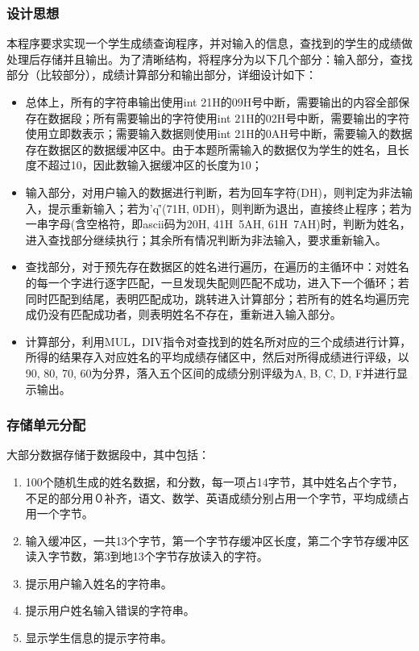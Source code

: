 \documentclass{article}
\begin{document}
	\subsubsection{设计思想}
	本程序要求实现一个学生成绩查询程序，并对输入的信息，查找到的学生的成绩做处理后存储并且输出。为了清晰结构，将程序分为以下几个部分：输入部分，查找部分（比较部分），成绩计算部分和输出部分，详细设计如下：
	\begin{itemize}
		\item 总体上，所有的字符串输出使用int 21H的09H号中断，需要输出的内容全部保存在数据段；所有需要输出的字符使用int 21H的02H号中断，需要输出的字符使用立即数表示；需要输入数据则使用int 21H的0AH号中断，需要输入的数据存在数据区的数据缓冲区中。由于本题所需输入的数据仅为学生的姓名，且长度不超过10，因此数输入据缓冲区的长度为10；
		\item 输入部分，对用户输入的数据进行判断，若为回车字符(DH)，则判定为非法输入，提示重新输入；若为’q\r’(71H, 0DH)，则判断为退出，直接终止程序；若为一串字母(含空格符，即ascii码为20H, 41H~5AH, 61H~7AH)时，判断为姓名，进入查找部分继续执行；其余所有情况判断为非法输入，要求重新输入。
		\item 查找部分，对于预先存在数据区的姓名进行遍历，在遍历的主循环中：对姓名的每一个字进行逐字匹配，一旦发现失配则匹配不成功，进入下一个循环；若同时匹配到结尾，表明匹配成功，跳转进入计算部分；若所有的姓名均遍历完成仍没有匹配成功者，则表明姓名不存在，重新进入输入部分。
		\item 计算部分，利用MUL，DIV指令对查找到的姓名所对应的三个成绩进行计算，所得的结果存入对应姓名的平均成绩存储区中，然后对所得成绩进行评级，以90, 80, 70, 60为分界，落入五个区间的成绩分别评级为A, B, C, D, F并进行显示输出。
	\end{itemize}

	\subsubsection{存储单元分配}
		大部分数据存储于数据段中，其中包括：
		\begin{enumerate}
			\item 100个随机生成的姓名数据，和分数，每一项占14字节，其中姓名占个字节，不足的部分用０补齐，语文、数学、英语成绩分别占用一个字节，平均成绩占用一个字节。
			\item 输入缓冲区，一共13个字节，第一个字节存缓冲区长度，第二个字节存缓冲区读入字节数，第3到地13个字节存放读入的字符。
			\item 提示用户输入姓名的字符串。
			\item 提示用户姓名输入错误的字符串。
			\item 显示学生信息的提示字符串。
		\end{enumerate}
\end{document}
